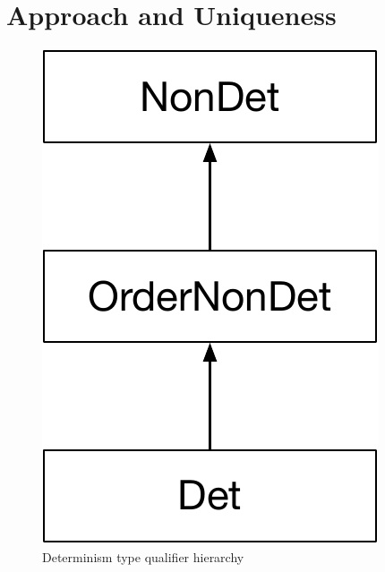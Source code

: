 \section{Approach and Uniqueness\label{sec:approach}}
\begin{figure}
    \begin{center}
        \includegraphics[scale=0.37]{detHierarchy}
    \end{center}
    \caption{Determinism type qualifier hierarchy}
    \label{fig:determinism-hierarchy}
\end{figure}

